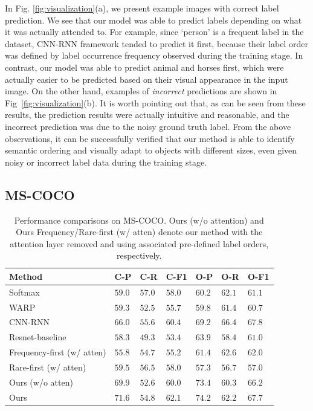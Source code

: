 \documentclass[letterpaper]{article} %
\begin{document}
In Fig. \ref{fig:visualization}(a), we present example images with correct label prediction. We see that our model was able to predict labels depending on what it was actually attended to. For example, since `person' is a frequent label in the dataset, CNN-RNN framework tended to predict it first, because their label order was defined by label occurrence frequency observed during the training stage. In contrast, our model was able to predict animal and horses first, which were actually easier to be predicted based on their visual appearance in the input image. On the other hand, examples of \emph{incorrect} predictions are shown in Fig~\ref{fig:visualization}(b). It is worth pointing out that, as can be seen from these results, the prediction results were actually intuitive and reasonable, and the incorrect prediction was due to the noisy ground truth label. From the above observations, it can be successfully verified that our method is able to identify semantic ordering and visually adapt to objects with different sizes, even given noisy or incorrect label data during the training stage.

\subsection{MS-COCO}

\tabcolsep=1.5pt
\begin{table}[]
\centering

\caption{Performance comparisons on MS-COCO. Ours (w/o attention) and Ours Frequency/Rare-first (w/ atten) denote our method with the attention layer removed and using associated pre-defined label orders, respectively.\\}

\begin{tabular}{l||lll|lll}
\hline
Method  & C-P  & C-R  & C-F1 & O-P  & O-R  & O-F1 \\ \hline
Softmax & $59.0$ & $57.0$ & $58.0$ & $60.2$ & $62.1$ & $61.1$ \\
WARP     & $59.3$ & $52.5$ & $55.7$ & $59.8$ & $61.4$ & $60.7$ \\
CNN-RNN & $66.0$ & $55.6$ & $60.4$ & $69.2$ & $66.4$ & $\mathbf{67.8}$ \\
Resnet-baseline & $58.3$ & $49.3$ & $53.4$ & $63.9$ & $58.4$ & $61.0$ \\
Frequency-first (w/ atten)   & $55.8$ & $54.7$ & $55.2$ & $61.4$ & $62.6$ & $62.0$ \\
Rare-first (w/ atten)   & $59.5$ & $56.5$ & $58.0$ & $57.3$ & $56.7$ & $57.0$ \\
Ours (w/o atten)   & $69.9$ & $52.6$ & $60.0$ & $73.4$ & $60.3$ & $66.2$ \\
Ours    & $71.6$ & $54.8$ & $\mathbf{62.1}$ & $74.2$ & $62.2$ & $\mathbf{67.7}$ \\ \hline
\end{tabular}
\label{table:mscoco}
\end{table}
\end{document}
